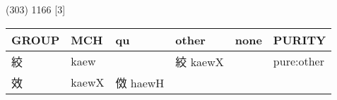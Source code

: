 \documentclass[14pt,a4paper]{scrartcl}
\begin{document}
(303) 1166 {[}3{]}

\begin{longtable}[c]{@{}llllll@{}}
\toprule
\begin{minipage}[b]{0.14\columnwidth}\raggedright\strut
GROUP
\strut\end{minipage} &
\begin{minipage}[b]{0.14\columnwidth}\raggedright\strut
MCH
\strut\end{minipage} &
\begin{minipage}[b]{0.14\columnwidth}\raggedright\strut
qu
\strut\end{minipage} &
\begin{minipage}[b]{0.14\columnwidth}\raggedright\strut
other
\strut\end{minipage} &
\begin{minipage}[b]{0.14\columnwidth}\raggedright\strut
none
\strut\end{minipage} &
\begin{minipage}[b]{0.14\columnwidth}\raggedright\strut
PURITY
\strut\end{minipage}\tabularnewline
\midrule
\endhead
\begin{minipage}[t]{0.14\columnwidth}\raggedright\strut
絞
\strut\end{minipage} &
\begin{minipage}[t]{0.14\columnwidth}\raggedright\strut
kaew
\strut\end{minipage} &
\begin{minipage}[t]{0.14\columnwidth}\raggedright\strut
\strut\end{minipage} &
\begin{minipage}[t]{0.14\columnwidth}\raggedright\strut
絞 kaewX
\strut\end{minipage} &
\begin{minipage}[t]{0.14\columnwidth}\raggedright\strut
\strut\end{minipage} &
\begin{minipage}[t]{0.14\columnwidth}\raggedright\strut
pure:other
\strut\end{minipage}\tabularnewline
\begin{minipage}[t]{0.14\columnwidth}\raggedright\strut
效
\strut\end{minipage} &
\begin{minipage}[t]{0.14\columnwidth}\raggedright\strut
kaewX
\strut\end{minipage} &
\begin{minipage}[t]{0.14\columnwidth}\raggedright\strut
傚 haewH
\strut\end{minipage} &

\end{longtable}
\end{document}
